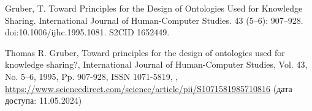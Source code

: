 \documentclass[732,14pt]{studrep}
\begin{document}
      

\begin{thebibliography}{99}
  

   Gruber, T. Toward Principles for the Design of Ontologies Used for Knowledge Sharing. International Journal of Human-Computer Studies. 43 (5–6): 907–928. doi:10.1006/ijhc.1995.1081. S2CID 1652449.

Thomas R. Gruber,
Toward principles for the design of ontologies used for knowledge sharing?,
International Journal of Human-Computer Studies,
Vol. 43, No. 5–6,
1995,
Pp. 907-928,
ISSN 1071-5819,
, \url{https://www.sciencedirect.com/science/article/pii/S1071581985710816} (дата доступа: 11.05.2024)
\end{thebibliography}
\end{document}
